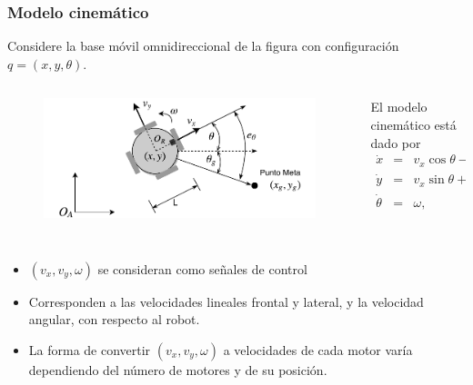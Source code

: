 \begin{frame}\frametitle{Modelo cinemático}
  Considere la base móvil omnidireccional de la figura con configuración $q=(x,y,\theta)$.
  \begin{columns}
    \begin{column}{0.5\textwidth}
      \begin{figure}
        \centering
        \includegraphics[width=\textwidth]{Figures/GoalPose.pdf}
      \end{figure}
    \end{column}
    \begin{column}{0.5\textwidth}
      El modelo cinemático está dado por
      \begin{eqnarray*} 
        \dot{x} &=& v_x\cos\theta - v_y\sin\theta\label{eq:Kinematic1}\\         
        \dot{y} &=& v_x\sin\theta + v_y\cos\theta\\ 
        \dot{\theta} &=& \omega,\label{eq:Kinematic3}
      \end{eqnarray*}
    \end{column}
  \end{columns}
  \[\]
  \begin{itemize}
  \item $(v_x, v_y, \omega)$ se consideran como señales de control
  \item Corresponden a las velocidades lineales frontal y lateral, y la velocidad angular, con respecto al robot.
  \item La forma de convertir $(v_x, v_y, \omega)$ a velocidades de cada motor varía dependiendo del número de motores y de su posición. 
  \end{itemize}
\end{frame}

